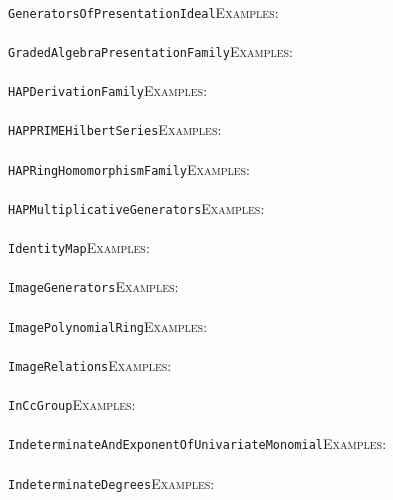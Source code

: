 \documentclass[a4paper,11pt]{report}
\begin{document}
{{ \\
 \texttt{GeneratorsOfPresentationIdeal}{\nobreakspace}{\nobreakspace}{\nobreakspace}{\nobreakspace}\textsc{Examples:} \\
 \\
 \texttt{GradedAlgebraPresentationFamily}{\nobreakspace}{\nobreakspace}{\nobreakspace}{\nobreakspace}\textsc{Examples:} \\
 \\
 \texttt{HAPDerivationFamily}{\nobreakspace}{\nobreakspace}{\nobreakspace}{\nobreakspace}\textsc{Examples:} \\
 \\
 \texttt{HAPPRIME{\textunderscore}HilbertSeries}{\nobreakspace}{\nobreakspace}{\nobreakspace}{\nobreakspace}\textsc{Examples:} \\
 \\
 \texttt{HAPRingHomomorphismFamily}{\nobreakspace}{\nobreakspace}{\nobreakspace}{\nobreakspace}\textsc{Examples:} \\
 \\
 \texttt{HAP{\textunderscore}MultiplicativeGenerators}{\nobreakspace}{\nobreakspace}{\nobreakspace}{\nobreakspace}\textsc{Examples:} \\
 \\
 \texttt{IdentityMap}{\nobreakspace}{\nobreakspace}{\nobreakspace}{\nobreakspace}\textsc{Examples:} \\
 \\
 \texttt{ImageGenerators}{\nobreakspace}{\nobreakspace}{\nobreakspace}{\nobreakspace}\textsc{Examples:} \\
 \\
 \texttt{ImagePolynomialRing}{\nobreakspace}{\nobreakspace}{\nobreakspace}{\nobreakspace}\textsc{Examples:} \\
 \\
 \texttt{ImageRelations}{\nobreakspace}{\nobreakspace}{\nobreakspace}{\nobreakspace}\textsc{Examples:} \\
 \\
 \texttt{InCcGroup}{\nobreakspace}{\nobreakspace}{\nobreakspace}{\nobreakspace}\textsc{Examples:} \\
 \\
 \texttt{IndeterminateAndExponentOfUnivariateMonomial}{\nobreakspace}{\nobreakspace}{\nobreakspace}{\nobreakspace}\textsc{Examples:} \\
 \\
 \texttt{IndeterminateDegrees}{\nobreakspace}{\nobreakspace}{\nobreakspace}{\nobreakspace}\textsc{Examples:} \\
}}
\end{document}
